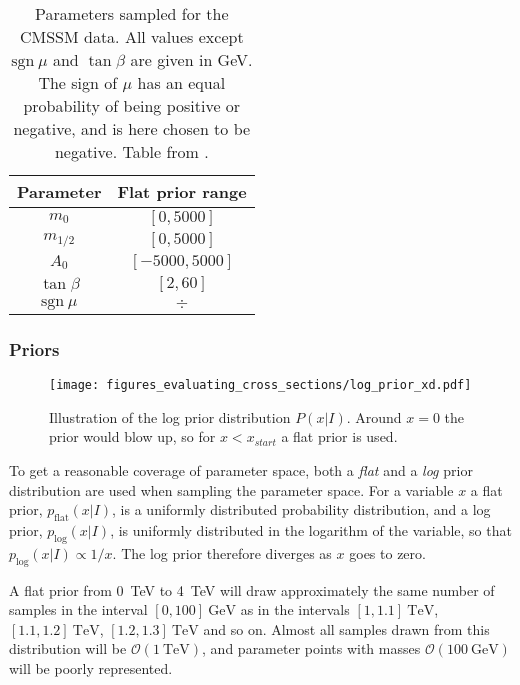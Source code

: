 \documentclass[twoside,english]{uiofysmaster}
\begin{document}
{{\begin{table}
\centering
\begin{tabular}{@{}cc@{}} \toprule
Parameter & Flat prior range\\ \midrule
$m_0$ & $[0, 5000]$\\
$m_{1/2}$ & $[0, 5000]$ \\
$A_0$ & $[-5000, 5000]$ \\
$\tan \beta$ & $[2, 60]$ \\
$\mathrm{sgn}~\mu$ & $\div$\\ \bottomrule
\end{tabular}
\caption{Parameters sampled for the CMSSM data. All values except $\mathrm{sgn}~\mu$ and $\tan \beta$ are given in GeV. The sign of $\mu$ has an equal probability of being positive or negative, and is here chosen to be negative. Table from \cite{sparre2018fast}.}
\label{Tab:: evaluating cross : Feature distributions CMSSM}
\end{table}

\subsubsection{Priors}


\begin{figure}
\centering
\texttt{[image: figures\_evaluating\_cross\_sections/log\_prior\_xd.pdf]}
\caption[An illustration of the log prior]{Illustration of the log prior distribution $P(x|I)$. Around $x=0$ the prior would blow up, so for $x < x_{start}$ a flat prior is used.}
\label{Fig:: evaluating cross : prior illustration}
\end{figure}

To get a reasonable coverage of parameter space, both a \textit{flat} and a \textit{log} prior distribution are used when sampling the parameter space. For a variable $x$ a flat prior, $p_{\mathrm{flat}}(x | I)$, is a uniformly distributed probability distribution, and a log prior, $p_{\mathrm{log}}(x |I)$, is uniformly distributed in the logarithm of the variable, so that $p_{\mathrm{log}}(x |I) \propto 1/x$. The log prior therefore diverges as $x$ goes to zero. 

A flat prior from 0~TeV to 4~TeV will draw approximately the same number of samples in the interval $[0, 100]~\mathrm{GeV}$ as in the intervals $[1,1.1]~\mathrm{TeV}$, $[1.1,1.2]~\mathrm{TeV}$,  $[1.2,1.3]~\mathrm{TeV}$ and so on. Almost all samples drawn from this distribution will be $\mathcal{O}(1~\mathrm{TeV})$, and parameter points with masses $\mathcal{O}( 100~\mathrm{GeV})$ will be poorly represented.

}}
\end{document}
